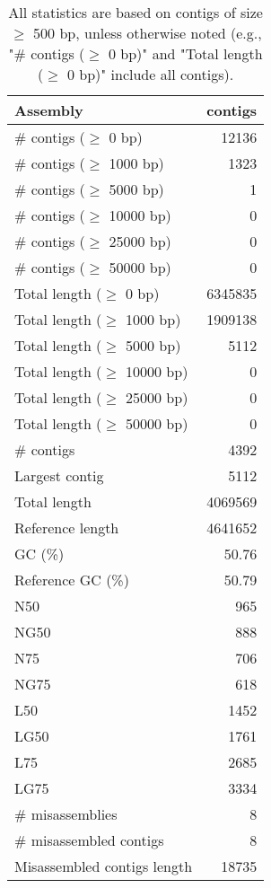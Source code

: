 \documentclass[12pt,a4paper]{article}
\begin{document}
\begin{table}[ht]
\begin{center}
\caption{All statistics are based on contigs of size $\geq$ 500 bp, unless otherwise noted (e.g., "\# contigs ($\geq$ 0 bp)" and "Total length ($\geq$ 0 bp)" include all contigs).}
\begin{tabular}{|l*{1}{|r}|}
\hline
Assembly & contigs \\ \hline
\# contigs ($\geq$ 0 bp) & 12136 \\ \hline
\# contigs ($\geq$ 1000 bp) & 1323 \\ \hline
\# contigs ($\geq$ 5000 bp) & 1 \\ \hline
\# contigs ($\geq$ 10000 bp) & 0 \\ \hline
\# contigs ($\geq$ 25000 bp) & 0 \\ \hline
\# contigs ($\geq$ 50000 bp) & 0 \\ \hline
Total length ($\geq$ 0 bp) & 6345835 \\ \hline
Total length ($\geq$ 1000 bp) & 1909138 \\ \hline
Total length ($\geq$ 5000 bp) & 5112 \\ \hline
Total length ($\geq$ 10000 bp) & 0 \\ \hline
Total length ($\geq$ 25000 bp) & 0 \\ \hline
Total length ($\geq$ 50000 bp) & 0 \\ \hline
\# contigs & 4392 \\ \hline
Largest contig & 5112 \\ \hline
Total length & 4069569 \\ \hline
Reference length & 4641652 \\ \hline
GC (\%) & 50.76 \\ \hline
Reference GC (\%) & 50.79 \\ \hline
N50 & 965 \\ \hline
NG50 & 888 \\ \hline
N75 & 706 \\ \hline
NG75 & 618 \\ \hline
L50 & 1452 \\ \hline
LG50 & 1761 \\ \hline
L75 & 2685 \\ \hline
LG75 & 3334 \\ \hline
\# misassemblies & 8 \\ \hline
\# misassembled contigs & 8 \\ \hline
Misassembled contigs length & 18735 \\ \hline

\end{tabular}
\end{center}
\end{table}
\end{document}
